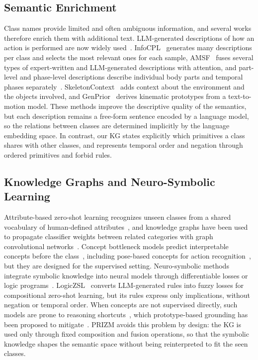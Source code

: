 \documentclass[11pt]{article}
\begin{document}
\subsection{Semantic Enrichment}

Class names provide limited and often ambiguous information, and several works therefore enrich them with additional text. LLM-generated descriptions of how an action is performed are now widely used~\cite{gzssar23,purls24,star24}. InfoCPL~\cite{infocpl25} generates many descriptions per class and selects the most relevant ones for each sample, AMSF~\cite{amsf25} fuses several types of expert-written and LLM-generated descriptions with attention, and part-level and phase-level descriptions describe individual body parts and temporal phases separately~\cite{purls24,dynapurls}. SkeletonContext~\cite{skeletoncontext} adds context about the environment and the objects involved, and GenPrior~\cite{genprior26} derives kinematic prototypes from a text-to-motion model. These methods improve the descriptive quality of the semantics, but each description remains a free-form sentence encoded by a language model, so the relations between classes are determined implicitly by the language embedding space. In contrast, our KG states explicitly which primitives a class shares with other classes, and represents temporal order and negation through ordered primitives and forbid rules.

\subsection{Knowledge Graphs and Neuro-Symbolic Learning}

Attribute-based zero-shot learning recognizes unseen classes from a shared vocabulary of human-defined attributes~\cite{lampert14}, and knowledge graphs have been used to propagate classifier weights between related categories with graph convolutional networks~\cite{wang18kg,dgp19}. Concept bottleneck models predict interpretable concepts before the class~\cite{koh20cbm}, including pose-based concepts for action recognition~\cite{pcbear}, but they are designed for the supervised setting. Neuro-symbolic methods integrate symbolic knowledge into neural models through differentiable losses or logic programs~\cite{xu18semloss,deepproblog18,ltn22}. LogicZSL~\cite{logiczsl25} converts LLM-generated rules into fuzzy losses for compositional zero-shot learning, but its rules express only implications, without negation or temporal order. When concepts are not supervised directly, such models are prone to reasoning shortcuts~\cite{marconato26}, which prototype-based grounding has been proposed to mitigate~\cite{andolfi25}. PRIZM avoids this problem by design: the KG is used only through fixed composition and fusion operations, so that the symbolic knowledge shapes the semantic space without being reinterpreted to fit the seen classes.
\end{document}
